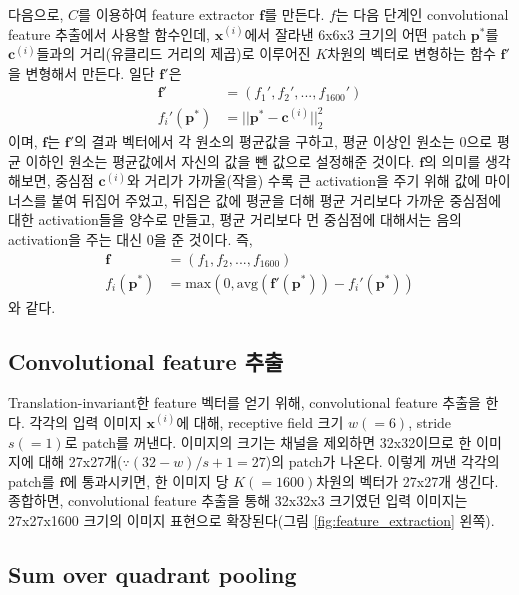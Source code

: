\documentclass[a4paper,9pt]{article}
\begin{document}
\begin{multicols*}{2}
다음으로, $C$를 이용하여 feature extractor $\mathbf{f}$를 만든다.
$f$는 다음 단계인 convolutional feature 추출에서 사용할 함수인데, $\mathbf{x}^{(i)}$에서 잘라낸 6x6x3 크기의 어떤 patch $\mathbf{p}^{*}$를 $\mathbf{c}^{(i)}$들과의 거리(유클리드 거리의 제곱)로 이루어진 $K$차원의 벡터로 변형하는 함수 $\mathbf{f}'$을 변형해서 만든다.
일단 $\mathbf{f}'$은
\begin{align*}
    \mathbf{f}' &= (f_{1}', f_{2}', ..., f_{1600}') \\
    f_{i}'(\mathbf{p}^{*}) &= || \mathbf{p}^{*} - \mathbf{c}^{(i)} ||_2^2
\end{align*}
이며, $\mathbf{f}$는 $\mathbf{f}'$의 결과 벡터에서 각 원소의 평균값을 구하고, 평균 이상인 원소는 0으로 평균 이하인 원소는 평균값에서 자신의 값을 뺀 값으로 설정해준 것이다.
$\mathbf{f}$의 의미를 생각해보면, 중심점 $\mathbf{c}^{(i)}$와 거리가 가까울(작을) 수록 큰 activation을 주기 위해 값에 마이너스를 붙여 뒤집어 주었고, 뒤집은 값에 평균을 더해 평균 거리보다 가까운 중심점에 대한 activation들을 양수로 만들고, 평균 거리보다 먼 중심점에 대해서는 음의 activation을 주는 대신 0을 준 것이다.
즉,
\begin{align*}
    \mathbf{f} &= (f_{1}, f_{2}, ..., f_{1600}) \\
    f_{i}(\mathbf{p}^{*}) &= \text{max} ( 0, \text{avg} (\mathbf{f}'(\mathbf{p}^{*})) - f_{i}'(\mathbf{p}^{*}) )
\end{align*}
와 같다.

\subsection{Convolutional feature 추출}

Translation-invariant한 feature 벡터를 얻기 위해, convolutional feature 추출을 한다.
각각의 입력 이미지 $\mathbf{x}^{(i)}$에 대해, receptive field 크기 $w(=6)$, stride $s(=1)$로 patch를 꺼낸다.
이미지의 크기는 채널을 제외하면 32x32이므로 한 이미지에 대해 27x27개($\because (32-w)/s+1=27$)의 patch가 나온다.
이렇게 꺼낸 각각의 patch를 $\mathbf{f}$에 통과시키면, 한 이미지 당 $K(=1600)$차원의 벡터가 27x27개 생긴다.
종합하면, convolutional feature 추출을 통해 32x32x3 크기였던 입력 이미지는 27x27x1600 크기의 이미지 표현으로 확장된다(그림 \ref{fig:feature_extraction} 왼쪽).

\subsection{Sum over quadrant pooling}
\label{sec:quadrant_pooling}


\end{multicols*}
\end{document}
